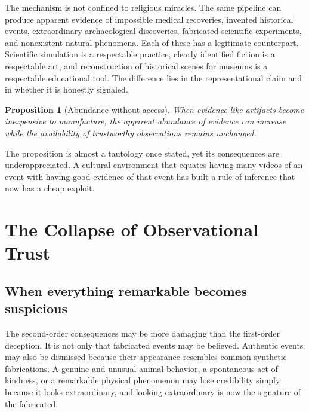 \documentclass[12pt]{article}
\theoremstyle{plain}
\newtheorem{proposition}{Proposition}
\theoremstyle{definition}
\theoremstyle{remark}
\begin{document}
The mechanism is not confined to religious miracles. The same pipeline can produce apparent evidence of impossible medical recoveries, invented historical events, extraordinary archaeological discoveries, fabricated scientific experiments, and nonexistent natural phenomena. Each of these has a legitimate counterpart. Scientific simulation is a respectable practice, clearly identified fiction is a respectable art, and reconstruction of historical scenes for museums is a respectable educational tool. The difference lies in the representational claim and in whether it is honestly signaled.

\begin{proposition}[Abundance without access]\label{prop:abundance}
When evidence-like artifacts become inexpensive to manufacture, the apparent abundance of evidence can increase while the availability of trustworthy observations remains unchanged.
\end{proposition}

The proposition is almost a tautology once stated, yet its consequences are underappreciated. A cultural environment that equates having many videos of an event with having good evidence of that event has built a rule of inference that now has a cheap exploit.

\section{The Collapse of Observational Trust}

\subsection{When everything remarkable becomes suspicious}

The second-order consequences may be more damaging than the first-order deception. It is not only that fabricated events may be believed. Authentic events may also be dismissed because their appearance resembles common synthetic fabrications. A genuine and unusual animal behavior, a spontaneous act of kindness, or a remarkable physical phenomenon may lose credibility simply because it looks extraordinary, and looking extraordinary is now the signature of the fabricated.
\end{document}
